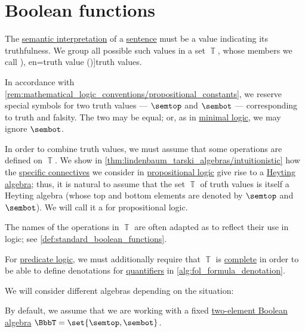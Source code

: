 \section{Boolean functions}\label{sec:boolean_functions}

\begin{definition}\label{def:truth_value_algebra}\mimprovised
  The \hyperref[con:syntax_semantics_duality]{semantic interpretation} of a \hyperref[con:proposition]{sentence} must be a value indicating its truthfulness. We group all possible such values in a set \( \BbbT \), whose members we call \term[ru=истинностное значение (\cite[def. 1.1.12]{Герасимов2014Вычислимость}), en=truth value (\cite[\S 6.5.9]{Mimram2020ProgramEqualsProof})]{truth values}.

  In accordance with \cref{rem:mathematical_logic_conventions/propositional_constants}, we reserve special symbols for two truth values --- \( \semtop \) and \( \sembot \) --- corresponding to truth and falsity. The two may be equal; or, as in \hyperref[con:minimal_logic]{minimal logic}, we may ignore \( \sembot \).

  In order to combine truth values, we must assume that some operations are defined on \( \BbbT \). We show in \cref{thm:lindenbaum_tarski_algebras/intuitionistic} how the \hyperref[def:propositional_alphabet/connectives]{specific connectives} we consider in \hyperref[def:propositional_logic]{propositional logic} give rise to a \hyperref[def:heyting_algebra]{Heyting algebra}; thus, it is natural to assume that the set \( \BbbT \) of truth values is itself a Heyting algebra (whose top and bottom elements are denoted by \( \semtop \) and \( \sembot \)). We will call it a  for propositional logic.

  The names of the operations in \( \BbbT \) are often adapted as to reflect their use in logic; see \cref{def:standard_boolean_functions}.

  For \hyperref[con:predicate_logic]{predicate logic}, we must additionally require that \( \BbbT \) is \hyperref[def:heyting_algebra/complete]{complete} in order to be able to define denotations for \hyperref[con:predicate_logic/quantifiers]{quantifiers} in \cref{alg:fol_formula_denotation}.

  We will consider different algebras depending on the situation:
  \begin{thmenum}
     By default, we assume that we are working with a fixed \hyperref[def:boolean_algebra/trivial]{two-element Boolean algebra} \( \BbbT = \set{ \semtop, \sembot } \).


\end{thmenum}
\end{definition}
